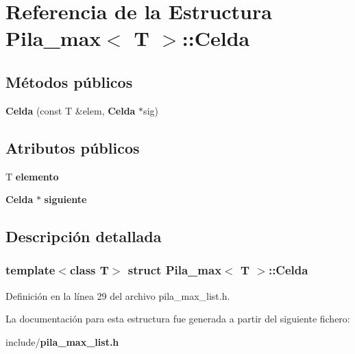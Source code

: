\section{Referencia de la Estructura Pila\+\_\+max$<$ T $>$\+:\+:Celda}
\label{structPila__max_1_1Celda}
\subsection*{Métodos públicos}
\begin{DoxyCompactItemize}
\item 
\label{structPila__max_1_1Celda_ab018e69430f54aa621d51a8c8d058437} 
{\bfseries Celda} (const T \&elem, {\bf Celda} $\ast$sig)
\end{DoxyCompactItemize}
\subsection*{Atributos públicos}
\begin{DoxyCompactItemize}
\item 
\label{structPila__max_1_1Celda_a3e44863ecddf5d472e33a9fc89d71b34} 
T {\bfseries elemento}
\item 
\label{structPila__max_1_1Celda_a6e3f568ef40f427dc09fad72ef149992} 
{\bf Celda} $\ast$ {\bfseries siguiente}
\end{DoxyCompactItemize}


\subsection{Descripción detallada}
\subsubsection*{template$<$class T$>$\newline
struct Pila\+\_\+max$<$ T $>$\+::\+Celda}



Definición en la línea 29 del archivo pila\+\_\+max\+\_\+list.\+h.



La documentación para esta estructura fue generada a partir del siguiente fichero\+:\begin{DoxyCompactItemize}
\item 
include/{\bf pila\+\_\+max\+\_\+list.\+h}\end{DoxyCompactItemize}
